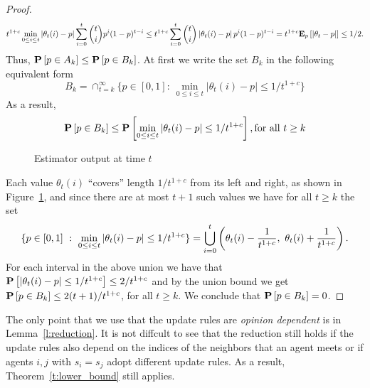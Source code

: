 \begin{proof}
  \[
    t^{1 + c} \min_{0 \leq i \leq t} \left| \theta_t(i) - p \right|
    \sum_{i=0}^t \binom{t}{i} p^i (1-p)^{t-i}
    \leq
    t^{1 + c} \sum_{i=0}^t \binom{t}{i} \left| \theta_t(i) - p \right| p^i (1-p)^{t-i}
    = t^{1+c} \bm{\mathrm{E}}_{p} \left[ |\theta_t  - p | \right]
    \leq
    1/2.
  \]
  Thus, $\bm{\mathrm{P}}\left[p \in A_k\right] \leq \bm{\mathrm{P}}\left[p \in B_k\right]$.
  At first we write the set $B_k$ in the following equivalent form
  \[
    B_k = \cap_{t=k}^{\infty}\{p \in [0,1]:~ \min_{0 \leq
      i \leq t} |\theta_t(i)-p|\leq 1/t^{1+c}
    \}
  \]
  As a result,
  \[
    \bm{\mathrm{P}}\left[p \in B_k\right]
    \leq \bm{\mathrm{P}}\left[\min_{0 \leq i \leq t}|\theta_t(i)-p| \leq 1/t^{1+c} \right],
    \text{for all } t \geq k
  \]
  \begin{figure}
    \centering
    \caption{Estimator output at time $t$} \label{fig:estimator}
  \end{figure}
  Each value $\theta_t(i)$ \enquote{covers} length $1/t^{1+c}$ from
  its left and right, as shown in Figure~\ref{fig:estimator},
  and since there are at most $t+1$ such values
  we have for all $t \geq k$ the set
  \[
    \{
    p \in [0,1]\ :\ {\min_{0 \leq i \leq t} |\theta_t(i)-p| \leq 1/t^{1+c} }
    \}
    =
    \bigcup_{i=0}^t
    \left(
    \theta_t(i) - \frac{1}{t^{1+c}},\ \theta_t(i) + \frac{1}{t^{1+c}}
    \right).
  \]
  For each interval in the above union we have that
  $\bm{\mathrm{P}}\left[|\theta_t(i)-p| \leq 1/t^{1+c}\right]\leq 2/t^{1+c}$
  and by the union bound we get
  $\bm{\mathrm{P}}\left[p \in B_k\right] \leq 2(t+1)/t^{1+c}$, for all $t \geq k$.
  We conclude that $\bm{\mathrm{P}}\left[p \in B_k\right] =0$.
\end{proof}

\begin{remark}\label{r:lower_bound_no-regret}
  The only point that we use that
  the update rules are \emph{opinion dependent} is in Lemma~\ref{l:reduction}.
  It is not diffcult to see that the reduction still holds if the update rules
  also depend on the indices of the neighbors that an agent meets or
  if agents $i,j$ with $s_i=s_j$ adopt different update rules.
  As a result, Theorem~\ref{t:lower_bound} still applies.
\end{remark}
